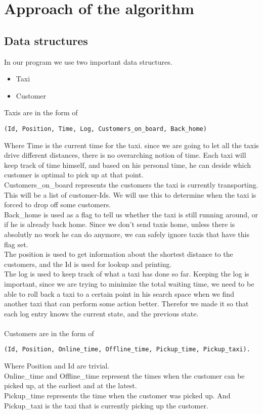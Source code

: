 \section{Approach of the algorithm}
\subsection{Data structures}
In our program we use two important data structures.
\begin{itemize}
\item Taxi
\item Customer
\end{itemize}
Taxis are in the form of
\begin{lstlisting}
(Id, Position, Time, Log, Customers_on_board, Back_home)
\end{lstlisting}
Where Time is the current time for the taxi. since we are going to let all the taxis drive different distances, there is no overarching notion of time. Each taxi will keep track of time himself, and based on his personal time, he can deside which customer is optimal to pick up at that point.\\
Customers\_on\_board represents the customers the taxi is currently transporting. This will be a list of customer-Ids. We will use this to determine when the taxi is forced to drop off some customers.\\
Back\_home is used as a flag to tell us whether the taxi is still running around, or if he is already back home. Since we don't send taxis home, unless there is absolutly no work he can do anymore, we can safely ignore taxis that have this flag set.\\
The position is used to get information about the shortest distance to the customers, and the Id is used for lookup and printing.\\
The log is used to keep track of what a taxi has done so far. Keeping the log is important, since we are trying to minimize the total waiting time, we need to be able to roll back a taxi to a certain point in his search space when we find another taxi that can perform some action better. Therefor we made it so that each log entry knows the current state, and the previous state.
\\\\
Customers are in the form of
\begin{lstlisting}
(Id, Position, Online_time, Offline_time, Pickup_time, Pickup_taxi).
\end{lstlisting}
Where Position and Id are trivial.\\
Online\_time and Offline\_time represent the times when the customer can be picked up, at the earliest and at the latest.\\
Pickup\_time represents the time when the customer was picked up. And Pickup\_taxi is the taxi that is currently picking up the customer.

